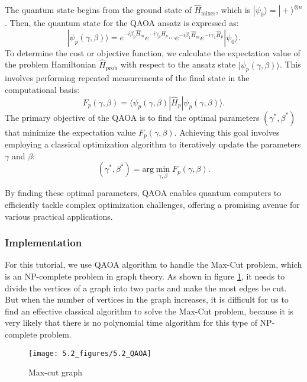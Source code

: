 The quantum state begins from the ground state of $\hat{H}_{\text{mixer}}$, which is $|\psi_0\rangle=|+\rangle^{\otimes n}$. Then, the quantum state for the QAOA ansatz is expressed as:
\begin{equation}
    |\psi_p(\gamma, \beta)\rangle = e^{-i\beta_p\hat{H}_m}e^{-i\gamma_p\hat{H}_p}\cdots e^{-i\beta_1\hat{H}_{m}}e^{-i\gamma_1\hat{H}_{p}}|\psi_0\rangle.
\end{equation}
To determine the cost or objective function, we calculate the expectation value of the problem Hamiltonian $\hat{H}_{\text{prob}}$ with respect to the ansatz state $|\psi_p(\gamma, \beta)\rangle$. This involves performing repeated measurements of the final state in the computational basis:
\begin{equation}
    F_p(\gamma, \beta) =\langle\psi_p(\gamma, \beta)|\hat{H}_{p} |\psi_p(\gamma,\beta)\rangle.
\end{equation}
The primary objective of the QAOA is to find the optimal parameters $(\gamma^*, \beta^*)$ that minimize the expectation value $F_p(\gamma, \beta)$. Achieving this goal involves employing a classical optimization algorithm to iteratively update the parameters $\gamma$ and $\beta$:
\begin{equation}
    (\gamma^*, \beta^*) = \text{arg}\min_{\gamma, \beta} F_p(\gamma, \beta).
\end{equation}

By finding these optimal parameters, QAOA enables quantum computers to efficiently tackle complex optimization challenges, offering a promising avenue for various practical applications.




\subsubsection{Implementation}

For this tutorial, we use QAOA algorithm to handle the Max-Cut problem,  which is an NP-complete problem in graph theory. As shown in figure \ref{5.1_QAOA}, it needs to divide the vertices of a graph into two parts and make the most edges be cut. But when the number of vertices in the graph increases, it is difficult for us to find an effective classical algorithm to solve the Max-Cut problem, because it is very likely that there is no polynomial time algorithm for this type of NP-complete problem.

\begin{figure}[H]
    \centering
    \texttt{[image: 5.2\_figures/5.2\_QAOA]}
    \caption{Max-cut graph}
    \label{5.1_QAOA}
\end{figure}

